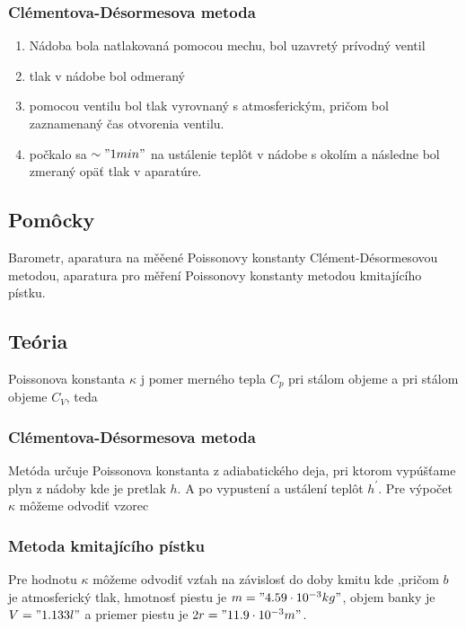\documentclass[a4paper,10pt]{article}
\begin{document}
\subsubsection{ Clémentova-Désormesova metoda}

\begin{enumerate}
\item Nádoba bola natlakovaná pomocou mechu, bol uzavretý prívodný ventil
\item tlak v nádobe bol odmeraný
\item pomocou ventilu bol tlak vyrovnaný s atmosferickým, pričom bol zaznamenaný čas otvorenia ventilu.
\item počkalo sa $\sim "1 min"$ na ustálenie teplôt v nádobe s okolím a následne bol zmeraný opäť tlak v aparatúre.
\end{enumerate}



\subsection{Pomôcky}
Barometr, aparatura na měěené Poissonovy konstanty Clément-Désormesovou metodou,
aparatura pro měření Poissonovy konstanty metodou kmitajícího pístku.

\subsection{Teória}
Poissonova konstanta $\kappa$ j pomer merného tepla $C_p$ pri stálom objeme a pri stálom objeme $C_V$, teda 

\subsubsection{ Clémentova-Désormesova metoda}
Metóda určuje Poissonova konstanta z adiabatického deja, pri ktorom vypúšťame plyn z nádoby kde je pretlak $h$. A po vypustení a ustálení teplôt $h^\prime$.
Pre výpočet $\kappa$ môžeme odvodiť vzorec

\subsubsection{Metoda kmitajícího pístku}
Pre hodnotu $\kappa$ môžeme odvodiť vzťah na závislosť do doby kmitu
kde
,pričom $b$ je atmosferický tlak, hmotnosť piestu je $m="4.59\cdot10^{-3} kg"$, objem banky je $V="1.133 l"$ a priemer piestu je $2r = "11.9\cdot10^{-3} m"$.
\end{document}
